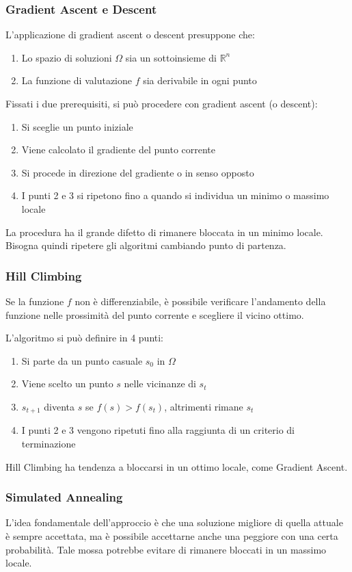 \documentclass[a4paper]{article}
\begin{document}
\subsubsection{Gradient Ascent e Descent}
L'applicazione di gradient ascent o descent presuppone che:
\begin{enumerate}
    \item Lo spazio di soluzioni $\Omega$ sia un sottoinsieme di $ \mathbb{R}^n$
    \item La funzione di valutazione $f$ sia derivabile in ogni punto
\end{enumerate}
Fissati i due prerequisiti, si può procedere con gradient ascent (o descent):
\begin{enumerate}
    \item Si sceglie un punto iniziale
    \item Viene calcolato il gradiente del punto corrente
    \item Si procede in direzione del gradiente o in senso opposto
    \item I punti 2 e 3 si ripetono fino a quando si individua un minimo o massimo locale
\end{enumerate}
La procedura ha il grande difetto di rimanere bloccata in un minimo locale. Bisogna quindi 
ripetere gli algoritmi cambiando punto di partenza.

\subsubsection{Hill Climbing}
Se la funzione $f$ non è differenziabile, è possibile verificare l'andamento della 
funzione nelle prossimità del punto corrente e scegliere il vicino ottimo.

L'algoritmo si può definire in 4 punti:
\begin{enumerate}
    \item Si parte da un punto casuale $s_0$ in $\Omega$
    \item Viene scelto un punto $s$ nelle vicinanze di $s_t$ 
    \item $s_{t+1}$ diventa $s$ se $f(s) > f(s_t)$, altrimenti rimane $s_t$
    \item I punti 2 e 3 vengono ripetuti fino alla raggiunta di un criterio di terminazione
\end{enumerate}
Hill Climbing ha tendenza a bloccarsi in un ottimo locale, come Gradient Ascent.

\subsubsection{Simulated Annealing}
L'idea fondamentale dell'approccio è che una soluzione migliore di quella 
attuale è sempre accettata, ma è possibile accettarne anche una peggiore 
con una certa probabilità.
Tale mossa potrebbe evitare di rimanere bloccati in un massimo locale.
\end{document}
